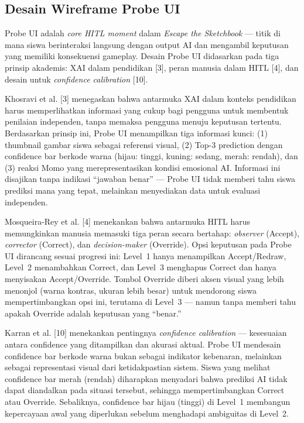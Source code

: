 \subsection{Desain Wireframe Probe UI}
\label{subsec:wireframe-probe-ui}

Probe UI adalah \textit{core HITL moment} dalam \textit{Escape the Sketchbook} --- titik di mana siswa berinteraksi langsung dengan output AI dan mengambil keputusan yang memiliki konsekuensi gameplay. Desain Probe UI didasarkan pada tiga prinsip akademis: XAI dalam pendidikan [3], peran manusia dalam HITL [4], dan desain untuk \textit{confidence calibration} [10].

Khosravi et al. [3] menegaskan bahwa antarmuka XAI dalam konteks pendidikan harus memperlihatkan informasi yang cukup bagi pengguna untuk membentuk penilaian independen, tanpa memaksa pengguna menuju keputusan tertentu. Berdasarkan prinsip ini, Probe UI menampilkan tiga informasi kunci: (1) thumbnail gambar siswa sebagai referensi visual, (2) Top-3 prediction dengan confidence bar berkode warna (hijau: tinggi, kuning: sedang, merah: rendah), dan (3) reaksi Momo yang merepresentasikan kondisi emosional AI. Informasi ini disajikan tanpa indikasi ``jawaban benar'' --- Probe UI tidak memberi tahu siswa prediksi mana yang tepat, melainkan menyediakan data untuk evaluasi independen.

Mosqueira-Rey et al. [4] menekankan bahwa antarmuka HITL harus memungkinkan manusia memasuki tiga peran secara bertahap: \textit{observer} (Accept), \textit{corrector} (Correct), dan \textit{decision-maker} (Override). Opsi keputusan pada Probe UI dirancang sesuai progresi ini: Level~1 hanya menampilkan Accept/Redraw, Level~2 menambahkan Correct, dan Level~3 menghapus Correct dan hanya menyisakan Accept/Override. Tombol Override diberi aksen visual yang lebih menonjol (warna kontras, ukuran lebih besar) untuk mendorong siswa mempertimbangkan opsi ini, terutama di Level~3 --- namun tanpa memberi tahu apakah Override adalah keputusan yang ``benar.''

Karran et al. [10] menekankan pentingnya \textit{confidence calibration} --- kesesuaian antara confidence yang ditampilkan dan akurasi aktual. Probe UI mendesain confidence bar berkode warna bukan sebagai indikator kebenaran, melainkan sebagai representasi visual dari ketidakpastian sistem. Siswa yang melihat confidence bar merah (rendah) diharapkan menyadari bahwa prediksi AI tidak dapat diandalkan pada situasi tersebut, sehingga mempertimbangkan Correct atau Override. Sebaliknya, confidence bar hijau (tinggi) di Level~1 membangun kepercayaan awal yang diperlukan sebelum menghadapi ambiguitas di Level~2.

